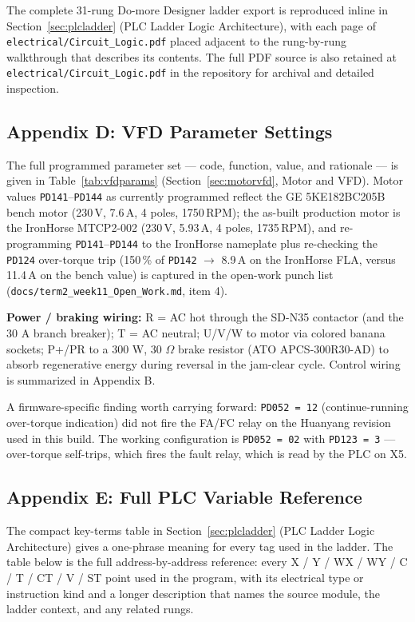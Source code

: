 \documentclass[hidelinks,12pt]{article}
\begin{document}
The complete 31-rung Do-more Designer ladder export is reproduced inline in Section~\ref{sec:plcladder} (PLC Ladder Logic Architecture), with each page of \texttt{electrical/Circuit\_Logic.pdf} placed adjacent to the rung-by-rung walkthrough that describes its contents. The full PDF source is also retained at \texttt{electrical/Circuit\_Logic.pdf} in the repository for archival and detailed inspection.

\subsection{Appendix D: VFD Parameter Settings}
\label{sec:appendix_vfd}
The full programmed parameter set --- code, function, value, and rationale --- is given
in Table~\ref{tab:vfdparams} (Section~\ref{sec:motorvfd}, Motor and VFD). Motor values
\texttt{PD141}--\texttt{PD144} as currently programmed reflect the GE 5KE182BC205B bench
motor (230\,V, 7.6\,A, 4 poles, 1750\,RPM); the as-built production motor is the
IronHorse MTCP2-002 (230\,V, 5.93\,A, 4 poles, 1735\,RPM), and re-programming
\texttt{PD141}--\texttt{PD144} to the IronHorse nameplate plus re-checking the
\texttt{PD124} over-torque trip (150\,\% of \texttt{PD142} $\rightarrow$ 8.9\,A on the
IronHorse FLA, versus 11.4\,A on the bench value) is captured in the open-work punch
list (\texttt{docs/term2\_week11\_Open\_Work.md}, item 4).

\textbf{Power / braking wiring:} R = AC hot through the SD-N35 contactor (and the
30 A branch breaker); T = AC neutral; U/V/W to motor via colored banana sockets; P+/PR to a 300 W, 30 $\Omega$
brake resistor (ATO APCS-300R30-AD) to absorb regenerative energy during reversal in
the jam-clear cycle. Control wiring is summarized in Appendix B.

A firmware-specific finding worth carrying forward: \texttt{PD052 = 12} (continue-running over-torque indication) did not fire the FA/FC relay on the Huanyang revision used in this build. The working configuration is \texttt{PD052 = 02} with \texttt{PD123 = 3} --- over-torque self-trips, which fires the fault relay, which is read by the PLC on X5.

\subsection{Appendix E: Full PLC Variable Reference}
\label{sec:appendix_varmap}

The compact key-terms table in Section~\ref{sec:plcladder} (PLC Ladder Logic
Architecture) gives a one-phrase meaning for every tag used in the ladder. The
table below is the full address-by-address reference: every X / Y / WX / WY / C
/ T / CT / V / ST point used in the program, with its electrical type or
instruction kind and a longer description that names the source module, the
ladder context, and any related rungs.
\end{document}
